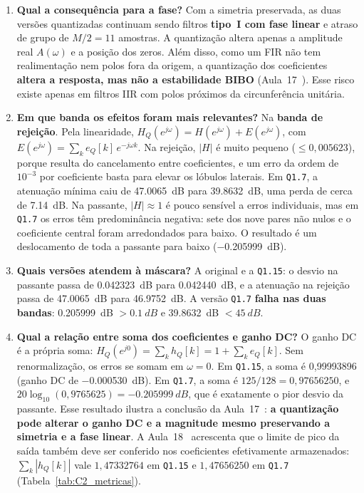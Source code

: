 \documentclass[11pt,a4paper]{article}
\newcommand{\MetricaCSomaQXV}{0{,}99993896}
\newcommand{\MetricaCSomaAbsQXV}{1{,}47332764}
\newcommand{\MetricaCSomaAbsQVII}{1{,}47656250}
\begin{document}
\begin{enumerate}[leftmargin=1.6em, itemsep=3pt]
    \item \textbf{Qual a consequência para a fase?}
    Com a simetria preservada, as duas versões quantizadas continuam sendo filtros \textbf{tipo~I com fase linear} e atraso de grupo de $M/2 = 11$ amostras. A quantização altera apenas a amplitude real $A(\omega)$ e a posição dos zeros. Além disso, como um FIR não tem realimentação nem polos fora da origem, a quantização dos coeficientes \textbf{altera a resposta, mas não a estabilidade BIBO} (Aula~17~\cite{aula17}). Esse risco existe apenas em filtros IIR com polos próximos da circunferência unitária.

    \item \textbf{Em que banda os efeitos foram mais relevantes?}
    Na \textbf{banda de rejeição}. Pela linearidade, $H_Q(e^{j\omega}) = H(e^{j\omega}) + E(e^{j\omega})$, com $E(e^{j\omega}) = \sum_k e_Q[k]\,e^{-j\omega k}$. Na rejeição, $|H|$ é muito pequeno ($\le 0,005623$), porque resulta do cancelamento entre coeficientes, e um erro da ordem de $10^{-3}$ por coeficiente basta para elevar os lóbulos laterais. Em \texttt{Q1.7}, a atenuação mínima caiu de \SI{47,0065}{dB} para \SI{39,8632}{dB}, uma perda de cerca de \SI{7,14}{dB}. Na passante, $|H| \approx 1$ é pouco sensível a erros individuais, mas em \texttt{Q1.7} os erros têm predominância negativa: sete dos nove pares não nulos e o coeficiente central foram arredondados para baixo. O resultado é um deslocamento de toda a passante para baixo (\SI{-0,205999}{dB}).

    \item \textbf{Quais versões atendem à máscara?}
    A original e a \texttt{Q1.15}: o desvio na passante passa de \SI{0,042323}{dB} para \SI{0,042440}{dB}, e a atenuação na rejeição passa de \SI{47,0065}{dB} para \SI{46,9752}{dB}. A versão \texttt{Q1.7} \textbf{falha nas duas bandas}: \SI{0,205999}{dB} $> \SI{0,1}{dB}$ e \SI{39,8632}{dB} $< \SI{45}{dB}$.

    \item \textbf{Qual a relação entre soma dos coeficientes e ganho DC?}
    O ganho DC é a própria soma: $H_Q(e^{j0}) = \sum_k h_Q[k] = 1 + \sum_k e_Q[k]$. Sem renormalização, os erros se somam em $\omega = 0$. Em \texttt{Q1.15}, a soma é \MetricaCSomaQXV{} (ganho DC de \SI{-0,000530}{dB}). Em \texttt{Q1.7}, a soma é $125/128 = 0,97656250$, e $20\log_{10}(0,9765625) = \SI{-0,205999}{dB}$, que é exatamente o pior desvio da passante. Esse resultado ilustra a conclusão da Aula~17~\cite{aula17}: \textbf{a quantização pode alterar o ganho DC e a magnitude mesmo preservando a simetria e a fase linear}. A Aula~18~\cite{aula18} acrescenta que o limite de pico da saída também deve ser conferido nos coeficientes efetivamente armazenados: $\sum_k |h_Q[k]|$ vale $\MetricaCSomaAbsQXV$ em \texttt{Q1.15} e $\MetricaCSomaAbsQVII$ em \texttt{Q1.7} (Tabela~\ref{tab:C2_metricas}).


\end{enumerate}
\end{document}
